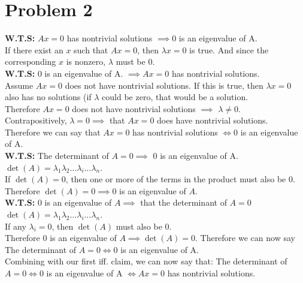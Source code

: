 \documentclass[fleqn]{article}
\begin{document}
\section*{Problem 2}
\textbf{W.T.S:} $Ax = 0$ has nontrivial solutions $\implies 0$ is an eigenvalue of A.\\ 
\linebreak
If there exist an $x$ such that $Ax = 0$, then $\lambda x = 0 $ is true.  And since the corresponding $x$ is nonzero, $\lambda$ must be 0.\\
\linebreak
\textbf{W.T.S:} $0$ is an eigenvalue of A. $\implies Ax = 0$ has nontrivial solutions.\\ 
\linebreak
Assume $Ax = 0$ does not have nontrivial solutions.  If this is true, then $\lambda x = 0$ also has no solutions (if $\lambda$ could be zero, that would be a solution.\\
Therefore $Ax = 0$ does not have nontrivial solutions $\implies $ $\lambda \neq 0$.\\
Contrapositively, $\lambda = 0 \implies$ that $Ax = 0$ does have nontrivial solutions.\\
\linebreak
Therefore we can say that $Ax = 0$ has nontrivial solutions $\iff 0$ is an eigenvalue of A.\\
\linebreak
\textbf{W.T.S:} The determinant of $A = 0 \implies $ 0 is an eigenvalue of A.\\
$\det(A) = \lambda_1 \lambda_2 \dots \lambda_i \dots \lambda_n$.\\  
If $\det(A) = 0$, then one or more of the terms in the product must also be $0$.\\
Therefore $\det(A) = 0 \implies 0$ is an eigenvalue of $A$.\\
\linebreak
\textbf{W.T.S:} $0$ is an eigenvalue of $A \implies$ that the determinant of $A = 0$ \\ 
\linebreak
$\det(A) = \lambda_1 \lambda_2 \dots \lambda_i \dots \lambda_n$.\\
If any $\lambda_i = 0$, then $\det(A)$ must also be 0.\\
Therefore $0$ is an eigenvalue of $A \implies \det(A) = 0.$
\linebreak
Therefore we can now say The determinant of $A = 0 \iff 0$ is an eigenvalue of A.\\
Combining with our first iff. claim, we can now say that: The determinant of $A = 0 \iff 0$ is an eigenvalue of A $\iff Ax = 0$ has nontrivial solutions.
\end{document}
